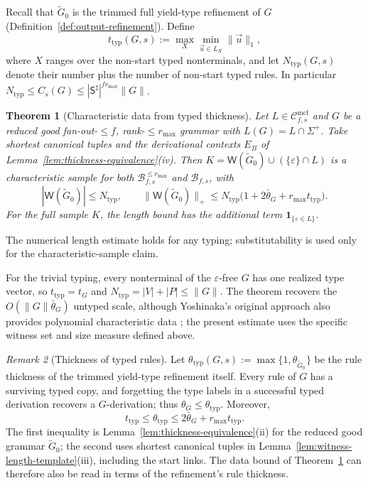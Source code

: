 \documentclass[11pt]{article}
\numberwithin{equation}{section}
\theoremstyle{plain}
\newtheorem{theorem}{Theorem}[section]
\theoremstyle{definition}
\theoremstyle{remark}
\newtheorem{remark}[theorem]{Remark}
\newcommand{\Wit}{\mathsf{W}}
\newcommand{\Cmcf}[2]{\mathcal{C}^{\mathrm{mcf}}_{#1,#2}}
\newcommand{\tuple}[1]{\vec{#1}}
\newcommand{\eps}{\varepsilon}
\theoremstyle{plain}
\begin{document}
Recall that $\widetilde G_0$ is the trimmed full yield-type refinement of $G$
(Definition~\ref{def:output-refinement}).  Define
\[
 t_{\mathrm{typ}}(G,s):=\max_{X}\min_{\tuple u\in L_X}\|\tuple u\|_1,
\]
where $X$ ranges over the non-start typed nonterminals, and let
$N_{\mathrm{typ}}(G,s)$ denote their number plus the number of non-start
typed rules.  In particular $N_{\mathrm{typ}}\le C_s(G)\le
|\mathsf S^\sharp|^{fr_{\max}}\|G\|$.

\begin{theorem}[Characteristic data from typed thickness]
\label{thm:data-from-typed-thickness}
Let $L\in\Cmcf{f}{s}$ and $G$ be a reduced good fan-out-$\le f$,
rank-$\le r_{\max}$ grammar with $L(G)=L\cap\Sigma^+$.
Take shortest canonical tuples and the derivational contexts $E_B$ of
Lemma~\ref{lem:thickness-equivalence}(iv).  Then
$K=\Wit(\widetilde G_0)\cup(\{\eps\}\cap L)$ is a characteristic sample
for both $\mathcal B^{\le r_{\max}}_{f,s}$ and $\mathcal B_{f,s}$, with
\[
 |\Wit(\widetilde G_0)|\le N_{\mathrm{typ}},\qquad
 \|\Wit(\widetilde G_0)\|_+\le
 N_{\mathrm{typ}}\bigl(1+2\bar\theta_G+r_{\max}t_{\mathrm{typ}}\bigr).
\]
For the full sample $K$, the length bound has the additional term
$\mathbf 1_{\{\eps\in L\}}$.
\end{theorem}

The numerical length estimate holds for any typing; substitutability is used
only for the characteristic-sample claim.

For the trivial typing, every nonterminal of the $\eps$-free $G$ has one
realized type vector, so $t_{\mathrm{typ}}=t_G$ and
$N_{\mathrm{typ}}=|V|+|P|\le\|G\|$.  The theorem recovers the
$O(\|G\|\bar\theta_G)$ untyped scale, although Yoshinaka's original
approach also provides polynomial characteristic data
\cite{Yoshinaka2011}; the present estimate uses the specific
witness set and size measure defined above.

\begin{remark}[Thickness of typed rules]
\label{rem:typed-thickness-equivalence}
Let $\theta_{\mathrm{typ}}(G,s):=
\max\{1,\theta_{\widetilde G_0}\}$ be the rule thickness of the
trimmed yield-type refinement itself.  Every rule of $G$ has a
surviving typed copy, and forgetting the type labels in a
successful typed derivation recovers a $G$-derivation; thus
$\theta_G\le\theta_{\mathrm{typ}}$.
Moreover,
\[
 t_{\mathrm{typ}}\le\theta_{\mathrm{typ}}
 \le2\bar\theta_G+r_{\max}t_{\mathrm{typ}}.
\]
The first inequality is Lemma~\ref{lem:thickness-equivalence}(ii)
for the reduced good grammar $\widetilde G_0$; the second uses
shortest canonical tuples in
Lemma~\ref{lem:witness-length-template}(iii), including the start
links.  The data bound of
Theorem~\ref{thm:data-from-typed-thickness} can therefore also be
read in terms of the refinement's rule thickness.
\end{remark}
\end{document}
